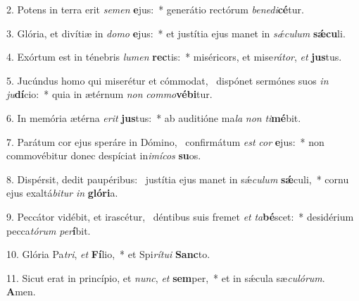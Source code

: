 2. Potens in terra erit \textit{se}\textit{men} \textbf{e}jus:~*  generátio rectórum \textit{be}\textit{ne}\textit{di}\textbf{cé}tur.\

3. Glória, et divítiæ in \textit{do}\textit{mo} \textbf{e}jus:~*  et justítia ejus manet in \textit{sǽ}\textit{cu}\textit{lum} \textbf{sǽ}\textbf{cu}li.\

4. Exórtum est in ténebris \textit{lu}\textit{men} \textbf{rec}tis:~*  miséricors, et mise\textit{rá}\textit{tor}, \textit{et} \textbf{jus}tus.\

5. Jucúndus homo qui miserétur et cómmodat, \dag\  dispónet sermónes suos \textit{in} \textit{ju}\textbf{dí}cio:~*  quia in ætérnum \textit{non} \textit{com}\textit{mo}\textbf{vé}\textbf{bi}tur.\

6. In memória ætérna \textit{e}\textit{rit} \textbf{jus}tus:~*  ab auditióne ma\textit{la} \textit{non} \textit{ti}\textbf{mé}bit.\

7. Parátum cor ejus speráre in Dómino, \dag\  confirmátum \textit{est} \textit{cor} \textbf{e}jus:~*  non commovébitur donec despíciat in\textit{i}\textit{mí}\textit{cos} \textbf{su}os.\

8. Dispérsit, dedit paupéribus: \dag\  justítia ejus manet in sǽ\textit{cu}\textit{lum} \textbf{sǽ}culi,~*  cornu ejus exaltá\textit{bi}\textit{tur} \textit{in} \textbf{gló}\textbf{ri}a.\

9. Peccátor vidébit, et irascétur, \dag\  déntibus suis fremet \textit{et} \textit{ta}\textbf{bé}scet:~*  desidérium pecca\textit{tó}\textit{rum} \textit{per}\textbf{í}bit.\

10. Glória Pa\textit{tri}, \textit{et} \textbf{Fí}lio,~*  et Spi\textit{rí}\textit{tu}\textit{i} \textbf{Sanc}to.\

11. Sicut erat in princípio, et \textit{nunc}, \textit{et} \textbf{sem}per,~*  et in sǽcula sæ\textit{cu}\textit{ló}\textit{rum}. \textbf{A}men.\

